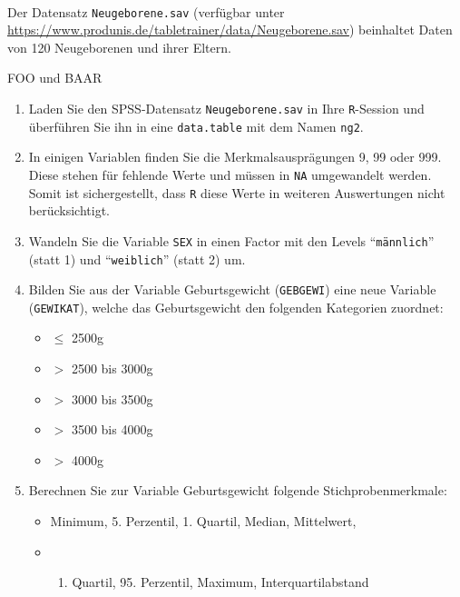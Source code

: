 \documentclass[
  letterpaper,
  DIV=11,
  numbers=noendperiod]{scrartcl}
\providecommand{\tightlist}{%
  \setlength{\itemsep}{0pt}\setlength{\parskip}{0pt}}\usepackage{longtable,booktabs,array}
\begin{document}
\begin{tcolorbox}[enhanced jigsaw, rightrule=.15mm, breakable, arc=.35mm, leftrule=.75mm, bottomrule=.15mm, colframe=quarto-callout-note-color-frame, colback=white, opacityback=0, left=2mm, toprule=.15mm]
{\textcolor{quarto-callout-note-color}{\faInfo\ \ }}
      

Der Datensatz \texttt{Neugeborene.sav} (verfügbar unter
\url{https://www.produnis.de/tabletrainer/data/Neugeborene.sav})
beinhaltet Daten von 120 Neugeborenen und ihrer Eltern.

FOO und BAAR

\begin{enumerate}
\def\labelenumi{\alph{enumi})}
\item
  Laden Sie den SPSS-Datensatz \texttt{Neugeborene.sav} in Ihre
  \texttt{R}-Session und überführen Sie ihn in eine \texttt{data.table}
  mit dem Namen \texttt{ng2}.
\item
  In einigen Variablen finden Sie die Merkmalsausprägungen 9, 99 oder
  999. Diese stehen für fehlende Werte und müssen in \texttt{NA}
  umgewandelt werden. Somit ist sichergestellt, dass \texttt{R} diese
  Werte in weiteren Auswertungen nicht berücksichtigt.
\item
  Wandeln Sie die Variable \texttt{SEX} in einen Factor mit den Levels
  ``\texttt{männlich}'' (statt 1) und ``\texttt{weiblich}'' (statt 2)
  um.
\item
  Bilden Sie aus der Variable Geburtsgewicht (\texttt{GEBGEWI}) eine
  neue Variable (\texttt{GEWIKAT}), welche das Geburtsgewicht den
  folgenden Kategorien zuordnet:

  \begin{itemize}
  \tightlist
  \item
    \(\le\) 2500g\\
  \item
    \(>\) 2500 bis 3000g
  \item
    \(>\) 3000 bis 3500g
  \item
    \(>\) 3500 bis 4000g
  \item
    \(>\) 4000g
  \end{itemize}
\item
  Berechnen Sie zur Variable Geburtsgewicht folgende
  Stichprobenmerkmale:

  \begin{itemize}
  \tightlist
  \item
    Minimum, 5. Perzentil, 1. Quartil, Median, Mittelwert,
  \item
    \begin{enumerate}
    \def\labelenumii{\arabic{enumii}.}
    \setcounter{enumii}{2}
    \tightlist
    \item
      Quartil, 95. Perzentil, Maximum, Interquartilabstand
    \end{enumerate}
  \end{itemize}


\end{enumerate}
\end{tcolorbox}
\end{document}
